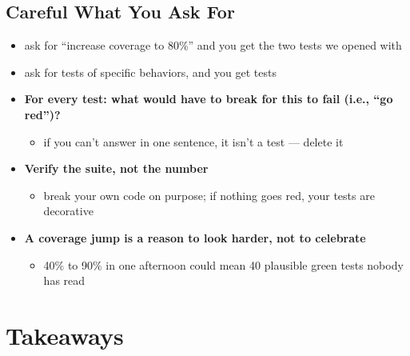 \subsection{Careful What You Ask For}

\begin{warnbox}[title=An agent optimizes exactly the metric you name]
\begin{itemize}
  \item ask for ``increase coverage to 80\%'' and you get the two tests we opened with
  \item ask for tests of specific behaviors, and you get tests
\end{itemize}
\end{warnbox}

\begin{itemize}
  \item \textbf{For every test: what would have to break for this to fail (i.e., ``go red'')?}
  \begin{itemize}
    \item if you can't answer in one sentence, it isn't a test --- delete it
  \end{itemize}
  \item \textbf{Verify the suite, not the number}
  \begin{itemize}
    \item break your own code on purpose; if nothing goes red, your tests are decorative
  \end{itemize}
  \item \textbf{A coverage jump is a reason to look harder, not to celebrate}
  \begin{itemize}
    \item 40\% to 90\% in one afternoon could mean 40 plausible green tests nobody has read
  \end{itemize}
\end{itemize}

\section{Takeaways}

